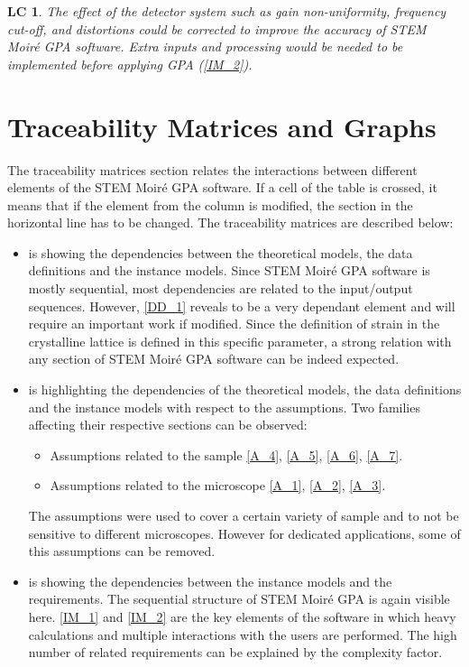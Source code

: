 \documentclass[12pt]{article}
\newcommand{\progname}{STEM Moir{\'e} GPA}
\newtheorem{LC}{LC}
\begin{document}
\begin{LC}
\label{LC_3}
\normalfont The effect of the detector system such as gain non-uniformity, frequency cut-off, and distortions could be corrected to improve the accuracy of \progname{} software. Extra inputs and processing would be needed to be implemented before applying GPA (\cref{IM_2}).
\end{LC}

\section{Traceability Matrices and Graphs}

The traceability matrices section relates the interactions between different elements of the \progname{} software. If a cell of the table is crossed, it means that if the element from the column is modified, the section in the horizontal line has to be changed. The traceability matrices are described below:
\begin{itemize}
\item{} is showing the dependencies between the theoretical models, the data definitions and the instance models. Since \progname{} software is mostly sequential, most dependencies are related to the input/output sequences. However, \cref{DD_1} reveals to be a very dependant element and will require an important work if modified. Since the definition of strain in the crystalline lattice is defined in this specific parameter, a strong relation with any section of \progname{} software can be indeed expected.
\item {} is highlighting the dependencies of the theoretical models, the data definitions and the instance models with respect to the assumptions. Two families affecting their respective sections can be observed:
\begin{itemize}
\item Assumptions related to the sample \cref{A_4}, \cref{A_5}, \cref{A_6}, \cref{A_7}. 
\item Assumptions related to the microscope \cref{A_1}, \cref{A_2}, \cref{A_3}.
\end{itemize}
The assumptions were used to cover a certain variety of sample and to not be sensitive to different microscopes. However for dedicated applications, some of this assumptions can be removed.
\item {} is showing the dependencies between the instance models and the requirements. The sequential structure of \progname{} is again visible here. \cref{IM_1} and \cref{IM_2} are the key elements of the software in which heavy calculations and multiple interactions with the users are performed. The high number of related requirements can be explained by the complexity factor.
\end{itemize}
\end{document}
